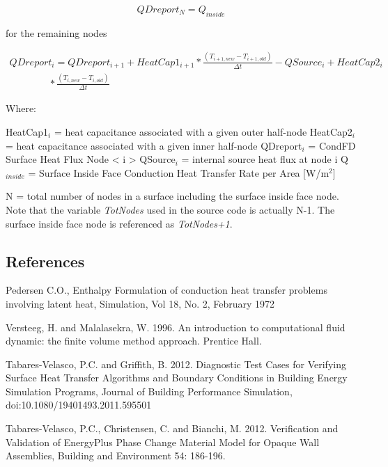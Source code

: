 \begin{equation}
{QDreport_{N} = Q_{inside}}
\end{equation}

for the remaining nodes

\begin{equation}
\begin{array}{l}
QDreport_{i} = QDreport_{i+1}+HeatCap1_{i+1}* \frac{\left(T_{i+1,new}-T_{i+1,old}\right)}{\Delta t}-QSource_{i}+HeatCap2_{i} \\
\quad \quad \quad \quad * \frac{\left(T_{i,new}-T_{i,old}\right)}{\Delta t}
\end{array}
\end{equation}

Where:

HeatCap1\(_{i}\) = heat capacitance associated with a given outer half-node HeatCap2\(_{i}\) = heat capacitance associated with a given inner half-node QDreport\(_{i}\) = CondFD Surface Heat Flux Node \textless{} i \textgreater{} QSource\(_{i}\) = internal source heat flux at node i Q\(_{inside}\) = Surface Inside Face Conduction Heat Transfer Rate per Area {[}W/m\(^{2}\){]}

N = total number of nodes in a surface including the surface inside face node. Note that the variable \emph{TotNodes} used in the source code is actually N-1. The surface inside face node is referenced as \emph{TotNodes+1}.

\subsection{References}\label{references-013}

Pedersen C.O., Enthalpy Formulation of conduction heat transfer problems involving latent heat, Simulation, Vol 18, No. 2, February 1972

Versteeg, H. and Malalasekra, W. 1996. An introduction to computational fluid dynamic: the finite volume method approach. Prentice Hall.

Tabares-Velasco, P.C. and Griffith, B. 2012. Diagnostic Test Cases for Verifying Surface Heat Transfer Algorithms and Boundary Conditions in Building Energy Simulation Programs, Journal of Building Performance Simulation, doi:10.1080/19401493.2011.595501

Tabares-Velasco, P.C., Christensen, C. and Bianchi, M. 2012. Verification and Validation of EnergyPlus Phase Change Material Model for Opaque Wall Assemblies, Building and Environment 54: 186-196.

